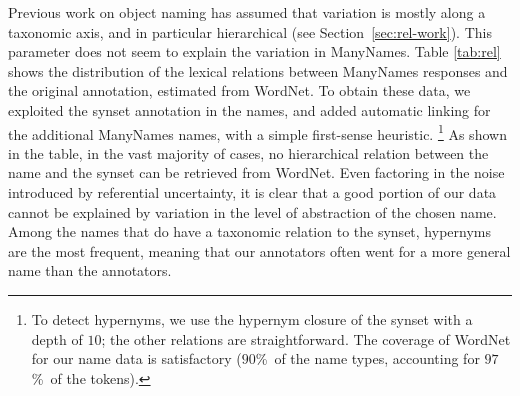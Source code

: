 Previous work on object naming has assumed that variation is mostly along a taxonomic axis, and in particular hierarchical (see Section~\ref{sec:rel-work}).
This parameter does not seem to explain the variation in ManyNames. 
Table \ref{tab:rel} shows the distribution of the lexical relations between ManyNames responses and the original \vg annotation, estimated from WordNet.
To obtain these data, we exploited the synset annotation in the \vg names, and added automatic linking for the additional ManyNames names, with a simple first-sense heuristic.%
\footnote{To detect hypernyms, we use the hypernym closure of the synset with a depth of $10$; the other relations are straightforward. The coverage of WordNet for our name data is satisfactory ($90$\%\ of the name types, accounting for $97$\%\ of the tokens).}
As shown in the table, in the vast majority of cases, no hierarchical relation between the name and the synset can be retrieved from WordNet.
Even factoring in the noise introduced by referential uncertainty, it is clear that a good portion of our data cannot be explained by variation in the level of abstraction of the chosen name. 
Among the names that do have a taxonomic relation to the synset, hypernyms are the most frequent, meaning that our annotators often went for a more general name than the \vg annotators.
%

